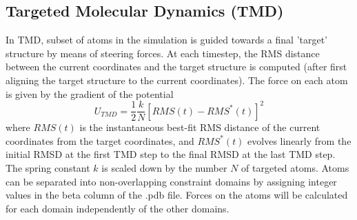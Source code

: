 \subsection{Targeted Molecular Dynamics (TMD)}

In TMD, subset of atoms in the simulation is guided towards a 
final 'target' structure by means of steering forces.  At each timestep, 
the RMS distance between
the current coordinates and the target structure is computed (after
first aligning the target structure to the current coordinates).
The force on each atom is given by the gradient of the potential
\begin{equation}
U_{TMD} = \frac{1}{2} \frac{k}{N} \left[ RMS(t) - RMS^*(t) \right]^2
\label{eq:tmdpotential}
\end{equation}
where $RMS(t)$ is the instantaneous best-fit RMS distance of the current
coordinates from the target coordinates, and $RMS^*(t)$ evolves linearly
from the initial RMSD at the first TMD step to the final RMSD at the last 
TMD step.  The spring constant $k$ is scaled down by the number $N$ of targeted
atoms. Atoms can be separated into non-overlapping constraint domains by
assigning integer values in the beta column of the .pdb file.  Forces on
the atoms will be calculated for each domain independently of the other domains.
 


